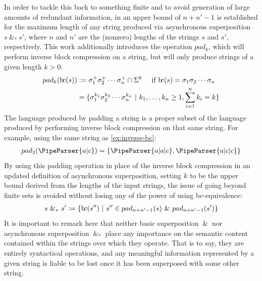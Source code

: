 \documentclass[a4paper,12pt,leqno]{article}
\newcommand{\bc}{{\rm b\!c}}
\newcommand{\vph}[1]{\vphantom{#1}}
\newcommand{\ebox}[1]{\fbox{$\vph{'(),}#1$}}
\renewcommand{\sp}{~\&~}
\newcommand{\spasync}{~\&_*~}
\newcommand{\EventString}[1]{%
	\renewcommand*{\do}[1]{\ebox{##1}}%
	\PipeParser{#1}%
}
\begin{document}
In order to tackle this back to something finite and to avoid generation of large amounts of redundant information, in \citet[p. 127]{woods2017towards} an upper bound of $n + n' - 1$\label{def:sp-upper-bound-length} is established for the maximum length of any string produced via asynchronous superposition $s \spasync s'$, where $n$ and $n'$ are the (nonzero) lengths of the strings $s$ and $s'$, respectively. This work additionally introduces the operation $pad_k$, which will perform inverse block compression on a string, but will only produce strings of a given length $k > 0$:
\begin{align}\label{def:padk}
	pad_k(\bc(s)) &:= \sigma_1^+ \sigma_2^+ \cdots \sigma_n^+ \cap \Sigma^k ~~~ \mbox{ if } \bc(s) = \sigma_1 \sigma_2 \cdots \sigma_n\\
	&=\{\sigma_1^{k_1}\sigma_2^{k_2}\cdots\sigma_n^{k_n} ~|~ k_1,\ldots,k_n \ge 1, \sum_{i = 1}^{n}k_i = k  \}\notag
\end{align}
The language produced by padding a string is a proper subset of the language produced by performing inverse block compression on that same string. For example, using the same string as \cref{ex:inverse-bc}:
\begin{align}\label{ex:padk}
	pad_3(\EventString{a|c}) = \{\EventString{a|a|c}, \EventString{a|c|c}\}
\end{align}
By using this padding operation in place of the inverse block compression in an updated definition of asynchronous superposition, setting $k$ to be the upper bound derived from the lengths of the input strings, the issue of going beyond finite sets is avoided without losing any of the power of using \bc-equivalence:
\begin{align}\label{def:async-superposition}
	s \spasync s' := \{\bc(s'') ~|~ s'' \in pad_{n+n'-1}(s) \sp pad_{n+n'-1}(s')\}
\end{align}\index{Superposition!Asynchronous $\spasync$}
It is important to remark here that neither basic superposition $\sp$ nor asynchronous superposition $\spasync$ place any importance on the semantic content contained within the strings over which they operate. That is to say, they are entirely syntactical operations, and any meaningful information represented by a given string is liable to be lost once it has been superposed with some other string.
\end{document}
